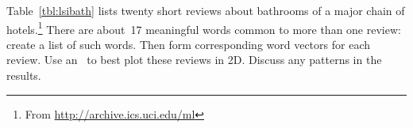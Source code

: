 \begin{exercise} \label{ex:lsibath} 
Table~\ref{tbl:lsibath} lists twenty short reviews about bathrooms of a major chain of hotels.\footnote{From \protect\url{http://archive.ics.uci.edu/ml}}
There are about~17 meaningful words common to more than one review: create a list of such words.
Then form corresponding word vectors for each review.
Use an \svd\ to best plot these reviews in 2D.
Discuss any patterns in the results.
\end{exercise}






\begin{comment}%
why, what caused X?
how did X occur?
what-if? what-if-not?
how does X compare with Y?
what is the evidence for X?
why is X important?
\end{comment}

\endinput%

